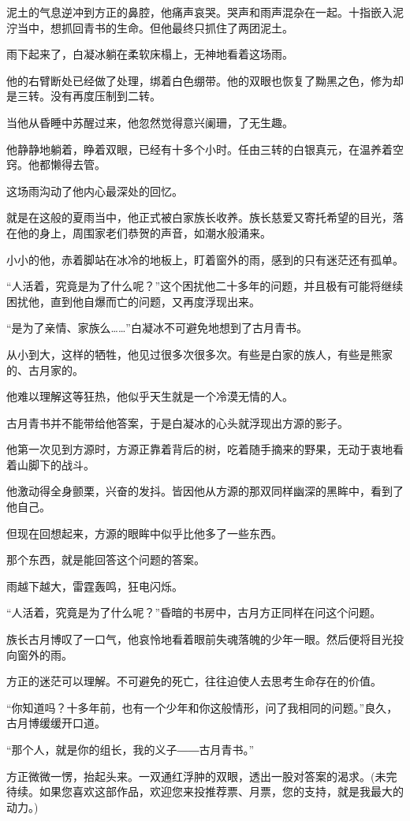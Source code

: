 \begin{this_body}
泥土的气息逆冲到方正的鼻腔，他痛声哀哭。哭声和雨声混杂在一起。十指嵌入泥泞当中，想抓回青书的生命。但他最终只抓住了两团泥土。

雨下起来了，白凝冰躺在柔软床榻上，无神地看着这场雨。

他的右臂断处已经做了处理，绑着白色绷带。他的双眼也恢复了黝黑之色，修为却是三转。没有再度压制到二转。

当他从昏睡中苏醒过来，他忽然觉得意兴阑珊，了无生趣。

他静静地躺着，睁着双眼，已经有十多个小时。任由三转的白银真元，在温养着空窍。他都懒得去管。

这场雨沟动了他内心最深处的回忆。

就是在这般的夏雨当中，他正式被白家族长收养。族长慈爱又寄托希望的目光，落在他的身上，周围家老们恭贺的声音，如潮水般涌来。

小小的他，赤着脚站在冰冷的地板上，盯着窗外的雨，感到的只有迷茫还有孤单。

“人活着，究竟是为了什么呢？”这个困扰他二十多年的问题，并且极有可能将继续困扰他，直到他自爆而亡的问题，又再度浮现出来。

“是为了亲情、家族么……”白凝冰不可避免地想到了古月青书。

从小到大，这样的牺牲，他见过很多次很多次。有些是白家的族人，有些是熊家的、古月家的。

他难以理解这等狂热，他似乎天生就是一个冷漠无情的人。

古月青书并不能带给他答案，于是白凝冰的心头就浮现出方源的影子。

他第一次见到方源时，方源正靠着背后的树，吃着随手摘来的野果，无动于衷地看着山脚下的战斗。

他激动得全身颤栗，兴奋的发抖。皆因他从方源的那双同样幽深的黑眸中，看到了他自己。

但现在回想起来，方源的眼眸中似乎比他多了一些东西。

那个东西，就是能回答这个问题的答案。

雨越下越大，雷霆轰鸣，狂电闪烁。

“人活着，究竟是为了什么呢？”昏暗的书房中，古月方正同样在问这个问题。

族长古月博叹了一口气，他哀怜地看着眼前失魂落魄的少年一眼。然后便将目光投向窗外的雨。

方正的迷茫可以理解。不可避免的死亡，往往迫使人去思考生命存在的价值。

“你知道吗？十多年前，也有一个少年和你这般情形，问了我相同的问题。”良久，古月博缓缓开口道。

“那个人，就是你的组长，我的义子――古月青书。”

方正微微一愣，抬起头来。一双通红浮肿的双眼，透出一股对答案的渴求。(未完待续。如果您喜欢这部作品，欢迎您来投推荐票、月票，您的支持，就是我最大的动力。)

\end{this_body}

